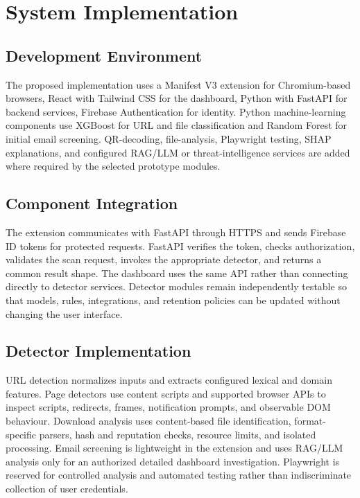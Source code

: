 \chapter{System Implementation}

\section{Development Environment}
\begin{sloppypar}
\raggedright
The proposed implementation uses a Manifest V3 extension for Chromium-based browsers,
React with Tailwind CSS for the dashboard, Python with FastAPI for backend services,
Firebase Authentication for identity. Python
machine-learning components use XGBoost for URL and file classification and Random
Forest for initial email screening. QR-decoding, file-analysis, Playwright testing,
SHAP explanations, and configured RAG/LLM or threat-intelligence services are added
where required by the selected prototype modules.
\end{sloppypar}

\section{Component Integration}
The extension communicates with FastAPI through HTTPS and sends Firebase ID tokens
for protected requests. FastAPI verifies the token, checks authorization, validates
the scan request, invokes the appropriate detector, and returns a common result shape.
The dashboard uses the same API rather than connecting directly to detector services. Detector
modules remain independently testable so that models, rules, integrations, and
retention policies can be updated without changing the user interface.

\section{Detector Implementation}
URL detection normalizes inputs and extracts configured lexical and domain features.
Page detectors use content scripts and supported browser APIs to inspect scripts,
redirects, frames, notification prompts, and observable DOM behaviour. Download
analysis uses content-based file identification, format-specific parsers, hash and
reputation checks, resource limits, and isolated processing. Email screening is
lightweight in the extension and uses RAG/LLM analysis only for an authorized detailed
dashboard investigation. Playwright is reserved for controlled analysis and automated
testing rather than indiscriminate collection of user credentials.

